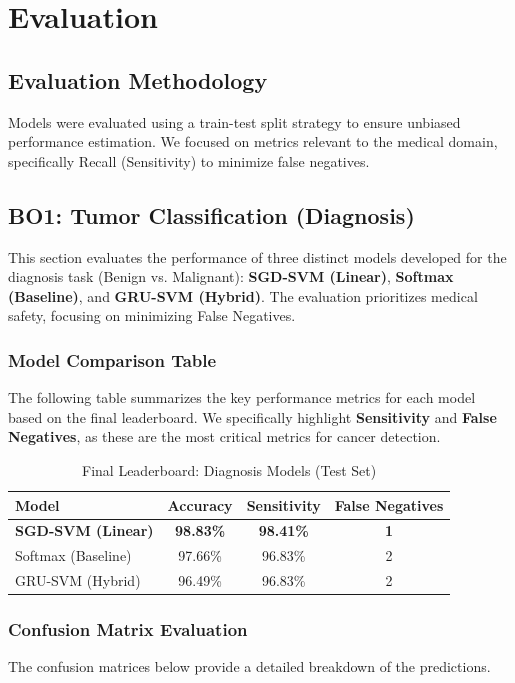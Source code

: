 \chapter{Evaluation}

\section{Evaluation Methodology}
Models were evaluated using a train-test split strategy to ensure unbiased performance estimation. We focused on metrics relevant to the medical domain, specifically Recall (Sensitivity) to minimize false negatives.

\section{BO1: Tumor Classification (Diagnosis)}
This section evaluates the performance of three distinct models developed for the diagnosis task (Benign vs. Malignant): \textbf{SGD-SVM (Linear)}, \textbf{Softmax (Baseline)}, and \textbf{GRU-SVM (Hybrid)}. The evaluation prioritizes medical safety, focusing on minimizing False Negatives.

\subsection{Model Comparison Table}
The following table summarizes the key performance metrics for each model based on the final leaderboard. We specifically highlight \textbf{Sensitivity} and \textbf{False Negatives}, as these are the most critical metrics for cancer detection.

\begin{table}[H]
    \centering
    \caption{Final Leaderboard: Diagnosis Models (Test Set)}
    \begin{tabular}{lccc}
        \toprule
        \textbf{Model} & \textbf{Accuracy} & \textbf{Sensitivity} & \textbf{False Negatives} \\
        \midrule
        \textbf{SGD-SVM (Linear)} & \textbf{98.83\%} & \textbf{98.41\%} & \textbf{1} \\
        Softmax (Baseline) & 97.66\% & 96.83\% & 2 \\
        GRU-SVM (Hybrid) & 96.49\% & 96.83\% & 2 \\
        \bottomrule
    \end{tabular}
\end{table}

\subsection{Confusion Matrix Evaluation}
The confusion matrices below provide a detailed breakdown of the predictions.

